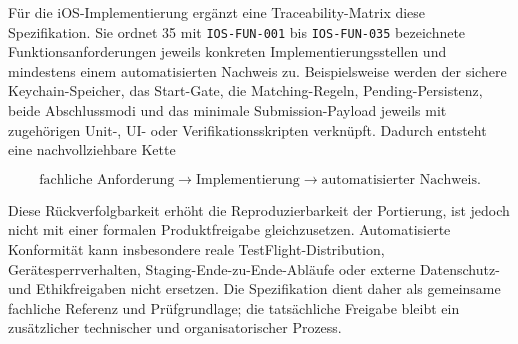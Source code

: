 \begin{neu}
Für die iOS-Implementierung ergänzt eine Traceability-Matrix diese Spezifikation. Sie ordnet 35 mit \texttt{IOS-FUN-001} bis \texttt{IOS-FUN-035} bezeichnete Funktionsanforderungen jeweils konkreten Implementierungsstellen und mindestens einem automatisierten Nachweis zu. Beispielsweise werden der sichere Keychain-Speicher, das Start-Gate, die Matching-Regeln, Pending-Persistenz, beide Abschlussmodi und das minimale Submission-Payload jeweils mit zugehörigen Unit-, UI- oder Verifikationsskripten verknüpft. Dadurch entsteht eine nachvollziehbare Kette

\[
\text{fachliche Anforderung}\rightarrow\text{Implementierung}\rightarrow\text{automatisierter Nachweis}.
\]

Diese Rückverfolgbarkeit erhöht die Reproduzierbarkeit der Portierung, ist jedoch nicht mit einer formalen Produktfreigabe gleichzusetzen. Automatisierte Konformität kann insbesondere reale TestFlight-Distribution, Gerätesperrverhalten, Staging-Ende-zu-Ende-Abläufe oder externe Datenschutz- und Ethikfreigaben nicht ersetzen. Die Spezifikation dient daher als gemeinsame fachliche Referenz und Prüfgrundlage; die tatsächliche Freigabe bleibt ein zusätzlicher technischer und organisatorischer Prozess.
\end{neu}
